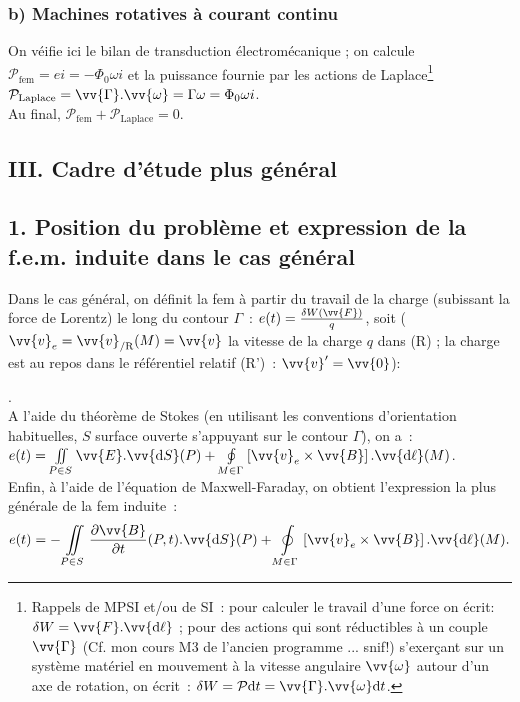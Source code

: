 \documentclass{article}
\newcommand{\mathcolorbox}[2]{\fcolorbox{black}{#1}{$#2$}}
\let\oldiint\iint
\renewcommand{\iint}{\oldiint\limits}
\let\oldoint\oint
\renewcommand{\oint}{\oldoint\limits}
\renewcommand\overrightarrow{\vv}
\let\rot\relax
\DeclareMathOperator{\rot}{\overrightarrow{\mathrm{rot}}}
\begin{document}
\subsubsection*{b) Machines rotatives à courant continu}
On véifie ici le bilan de transduction électromécanique ; on calcule
$\mathcal{P}_{\mathrm{fem}} = e i = -\Phi_{0}\omega i$ et la puissance
fournie par les actions de Laplace\footnote{Rappels de MPSI et/ou de
SI : pour calculer le travail d'une force on écrit: $\delta W
=\overrightarrow{F}.\overrightarrow{\mathrm{d}\ell}$ ; pour des actions qui
sont réductibles à un couple $\overrightarrow{\Gamma}$ (Cf. mon
cours M3 de l'ancien programme ... snif!) s'exerçant sur un système
matériel en mouvement à la vitesse angulaire
$\overrightarrow{\omega}$ autour d'un axe de rotation, on écrit :
$\delta W = \mathcal{P}\mathrm{d}t =
\overrightarrow{\Gamma}.\overrightarrow{\omega}\mathrm{d}t$.}
$\mathcal{P}_{\mathrm{Laplace}} =
\overrightarrow{\Gamma}.\overrightarrow{\omega} = \Gamma \omega =
\Phi_{0}\omega i$. \\
Au final, $\mathcal{P}_{\mathrm{fem}}+\mathcal{P}_{\mathrm{Laplace}}=0$.

\subsection*{III. Cadre d'étude plus général}
\subsection*{1. Position du problème et expression de la f.e.m. induite
dans le cas général}
Dans le cas général, on définit la fem à partir du travail de la
charge (subissant la force de Lorentz) le long du contour $\Gamma$ :
$e(t) = \frac{\delta W\left(\overrightarrow{F}\right)}{q}$, soit
($\overrightarrow{v}_{e} =
\overrightarrow{v}_{\mathrm{/R}}(M)=\overrightarrow{v}$ la vitesse de la
charge $q$ dans (R) ; la charge est au repos dans le référentiel
relatif (R') : $\overrightarrow{v}'=\overrightarrow{0}$):
\\
\centerline{\mathcolorbox{gray!20}{e(t) = \oint_{M\in
\Gamma}\overrightarrow{E}.\overrightarrow{\mathrm{d}\ell}(M)+\oint_{M\in
\Gamma}\left[\overrightarrow{v}_{e}\times
\overrightarrow{B}\right].\overrightarrow{\mathrm{d}\ell}(M)}}. \\
A l'aide du théorème de Stokes (en utilisant les conventions
d'orientation habituelles, $S$ surface ouverte s'appuyant sur le
contour $\Gamma$), on a : $e(t) = \iint_{P\in
S}\rot \overrightarrow{E}.\overrightarrow{\mathrm{d}S}(P)+\oint_{M\in
\Gamma}\left[\overrightarrow{v}_{e}\times
\overrightarrow{B}\right].\overrightarrow{\mathrm{d}\ell}(M)$. \\
Enfin, à l'aide de l'équation de Maxwell-Faraday, on obtient
l'expression la plus générale de la fem induite :
\begin{eqnarray}\label{Eq.60}
e(t) = -\iint_{P\in S}\frac{\partial\overrightarrow{B}}{\partial
t}(P,t).\overrightarrow{\mathrm{d}S}(P) +\oint_{M\in
\Gamma}\left[\overrightarrow{v}_{e}\times
\overrightarrow{B}\right].\overrightarrow{\mathrm{d}\ell}(M).
\end{eqnarray}
\end{document}
